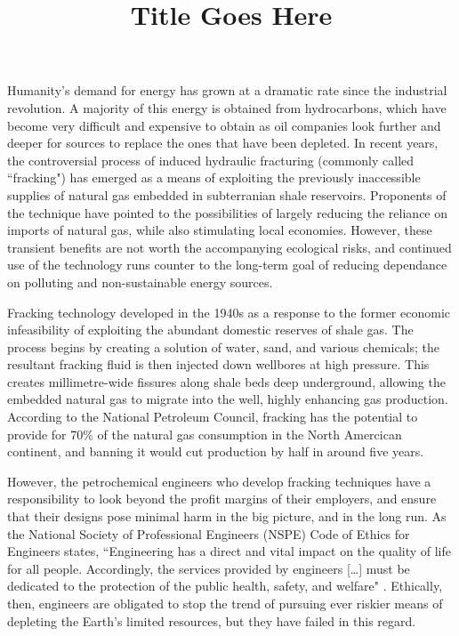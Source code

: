 \documentclass[12pt,letterpaper]{article}
\title{Title Goes Here}
\begin{document}
\makeheader

Humanity's demand for energy has grown at a dramatic rate since the industrial revolution. A majority of this energy is obtained from hydrocarbons, which have become very difficult and expensive to obtain as oil companies look further and deeper for sources to replace the ones that have been depleted. In recent years, the controversial process of induced hydraulic fracturing (commonly called ``fracking") has emerged as a means of exploiting the previously inaccessible supplies of natural gas embedded in subterranian shale reservoirs. Proponents of the technique have pointed to the possibilities of largely reducing the reliance on imports of natural gas, while also stimulating local economies. However, these transient benefits are not worth the accompanying ecological risks, and continued use of the technology runs counter to the long-term goal of reducing dependance on polluting and non-sustainable energy sources.

Fracking technology developed in the 1940s as a response to the former economic infeasibility of exploiting the abundant domestic reserves of shale gas.
The process begins by creating a solution of water, sand, and various chemicals; the resultant fracking fluid is then injected down wellbores at high pressure. This creates millimetre-wide fissures along shale beds deep underground, allowing the embedded natural gas to migrate into the well, highly enhancing gas production. According to the National Petroleum Council, fracking has the potential to provide for 70\%  \cite{npc}  of the natural gas consumption in the North Amercican continent, and banning it would cut production by half in around five years.

However, the petrochemical engineers who develop fracking techniques have a responsibility to look beyond the profit margins of their employers, and ensure that their designs pose minimal harm in the big picture, and in the long run.
As the National Society of Professional Engineers (NSPE) Code of Ethics for Engineers states, 
``Engineering has a direct and vital impact on the quality of life for all people. Accordingly, the services provided by engineers [\ldots] must be dedicated to the protection of the public health, safety, and welfare" \cite{ethics}.
Ethically, then, engineers are obligated to stop the trend of pursuing ever riskier means of depleting the Earth's limited resources, but they have failed in this regard.
\end{document}
